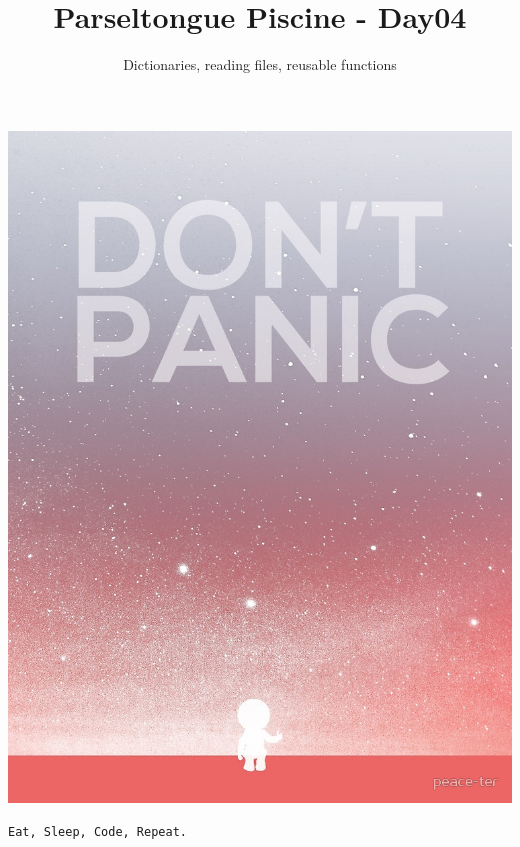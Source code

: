 \documentclass{42-en}
\begin{document}
\title{Parseltongue Piscine - Day04}
\subtitle{Dictionaries, reading files, reusable functions}


\maketitle

\tableofcontents


\newpage

\bigskip

\centerline{\includegraphics[width=150mm]{images/dont_panic.jpeg}}

\centerline{\texttt{Eat, Sleep, Code, Repeat.}}

\end{document}

